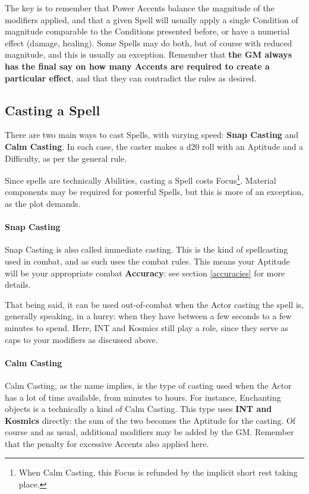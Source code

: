 The key is to remember that Power Accents balance the magnitude of the modifiers applied, and that a given Spell will usually apply a single Condition of magnitude comparable to the Conditions presented before, or have a numerial effect (damage, healing). Some Spells may do both, but of course with reduced magnitude, and this is usually an exception. Remember that \textbf{the GM always has the final say on how many Accents are required to create a particular effect}, and that they can contradict the rules as desired.


\subsection{Casting a Spell}
\label{casting_types}

There are two main ways to cast Spells, with varying speed: \textbf{Snap Casting} and \textbf{Calm Casting}. In each case, the caster makes a d20 roll with an Aptitude and a Difficulty, as per the general rule.

Since spells are technically Abilities, casting a Spell costs Focus\footnote{When Calm Casting, this Focus is refunded by the implicit short rest taking place.}. Material components may be required for powerful Spells, but this is more of an exception, as the plot demands.

\paragraph{Snap Casting}

Snap Casting is also called immediate casting. This is the kind of spellcasting used in combat, and as such uses the combat rules. This means your Aptitude will be your appropriate combat \textbf{Accuracy}: see section \ref{accuracies} for more details. 

That being said, it can be used out-of-combat when the Actor casting the spell is, generally speaking, in a hurry: when they have between a few seconds to a few minutes to spend. Here, INT and Kosmics still play a role, since they serve as caps to your modifiers as discussed above.

\paragraph{Calm Casting}

Calm Casting, as the name implies, is the type of casting used when the Actor has a lot of time available, from minutes to hours. For instance, Enchanting objects is a technically a kind of Calm Casting. This type uses \textbf{INT and Kosmics} directly: the sum of the two becomes the Aptitude for the casting. Of course and as usual, additional modifiers may be added by the GM. Remember that the penalty for excessive Accents also applied here.


